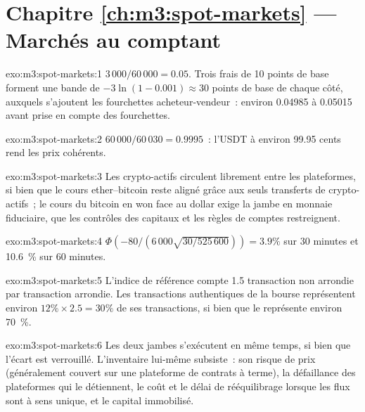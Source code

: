 \section*{Chapitre \ref{ch:m3:spot-markets} --- Marchés au comptant}

\begin{solution}{exo:m3:spot-markets:1}
$3\,000/60\,000 = 0.05$. Trois frais de 10 points de base forment une bande de $-3\ln(1 - 0.001) \approx 30$ points
de base de chaque côté, auxquels s'ajoutent les fourchettes acheteur-vendeur~: environ 0.04985 à 0.05015 avant prise en compte des fourchettes.
\end{solution}

\begin{solution}{exo:m3:spot-markets:2}
$60\,000/60\,030 = 0.9995$~: l'USDT à environ 99.95 cents rend les prix cohérents.
\end{solution}

\begin{solution}{exo:m3:spot-markets:3}
Les crypto-actifs circulent librement entre les plateformes, si bien que le cours ether--bitcoin reste aligné grâce aux seuls transferts de crypto-actifs~; le
cours du bitcoin en won face au dollar exige la jambe en monnaie fiduciaire, que les contrôles des capitaux et les règles de comptes restreignent.
\end{solution}

\begin{solution}{exo:m3:spot-markets:4}
$\Phi(-80/(6\,000\sqrt{30/525\,600})) = 3.9\%$ sur 30 minutes et 10.6~\% sur 60 minutes.
\end{solution}

\begin{solution}{exo:m3:spot-markets:5}
L'indice de référence compte 1.5 transaction non arrondie par transaction arrondie. Les transactions authentiques de la bourse représentent environ $12\% \times 2.5 =
30\%$ de ses transactions, si bien que le  représente environ 70~\%.
\end{solution}

\begin{solution}{exo:m3:spot-markets:6}
Les deux jambes s'exécutent en même temps, si bien que l'écart est verrouillé. L'inventaire lui-même subsiste~: son risque de prix (généralement couvert
sur une plateforme de contrats à terme), la défaillance des plateformes qui le détiennent, le coût et le délai de rééquilibrage lorsque les flux sont à sens unique,
et le capital immobilisé.
\end{solution}

